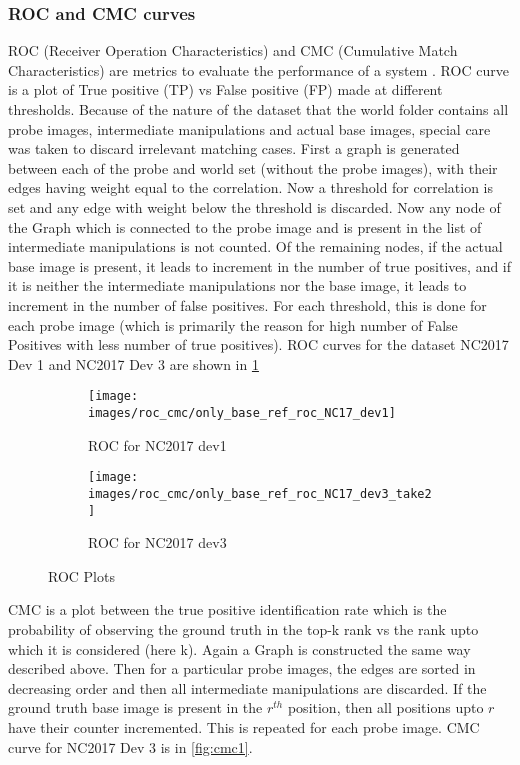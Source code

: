 \documentclass{article}
\begin{document}
\subsubsection{ROC and CMC curves}
ROC (Receiver Operation Characteristics) and CMC (Cumulative Match Characteristics) are metrics to evaluate the performance of a system \cite{RC_lec}.
ROC curve is a plot of True positive (TP) vs False positive (FP) made at different thresholds. Because of the nature of the dataset that the world folder contains all probe images, intermediate manipulations and actual base images, special care was taken to discard irrelevant matching cases. First a graph is generated between each of the probe and world set (without the probe images), with their edges having weight equal to the correlation. Now a threshold for correlation is set and any edge with weight below the threshold is discarded. Now any node of the Graph which is connected to the probe image and is present in the list of intermediate manipulations is not counted. Of the remaining nodes, if the actual base image is present, it leads to increment in the number of true positives, and if it is neither the intermediate manipulations nor the base image, it leads to increment in the number of false positives. For each threshold, this is done for each probe image (which is primarily the reason for high number of False Positives with less number of true positives). ROC curves for the dataset NC2017 Dev 1 and NC2017 Dev 3 are shown in \ref{fig:roc1}

\begin{figure}[H]
  \centering
  \begin{subfigure}[H]{1.0\linewidth}
    \centering
    \texttt{[image: images/roc\_cmc/only\_base\_ref\_roc\_NC17\_dev1]}
    \caption{ROC for NC2017 dev1}
  \end{subfigure}
  \begin{subfigure}[H]{1.0\linewidth}
    \centering
    \texttt{[image: images/roc\_cmc/only\_base\_ref\_roc\_NC17\_dev3\_take2]}
    \caption{ROC for NC2017 dev3}
  \end{subfigure}
  \caption{ROC Plots}
  \label{fig:roc1}
\end{figure}

CMC is a plot between the true positive identification rate which is the probability of observing the ground truth in the top-k rank vs the rank upto which it is considered (here k). Again a Graph is constructed the same way described above. Then for a particular probe images, the edges are sorted in decreasing order and then all intermediate manipulations are discarded. If the ground truth base image is present in the $r^{th}$ position, then all positions upto $r$ have their counter incremented. This is repeated for each probe image. CMC curve for NC2017 Dev 3 is in \ref{fig:cmc1}.
\end{document}
